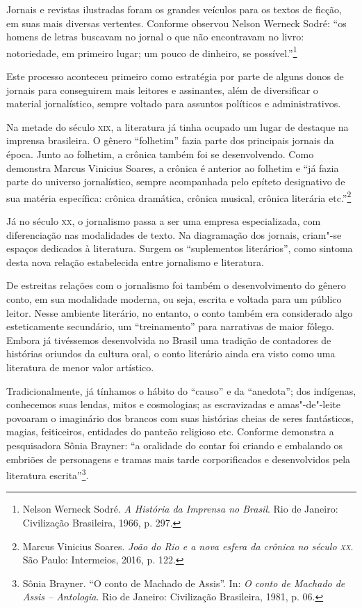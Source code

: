 \documentclass[11pt]{extarticle}
\begin{document}
Jornais e revistas ilustradas foram os grandes veículos para os textos
de ficção, em suas mais diversas vertentes. Conforme observou Nelson
Werneck Sodré: ``os homens de letras buscavam no jornal o que não
encontravam no livro: notoriedade, em primeiro lugar; um pouco de
dinheiro, se possível.''\footnote{Nelson Werneck Sodré. \emph{A História
  da Imprensa no Brasil}. Rio de Janeiro: Civilização Brasileira, 1966,
  p. 297.}

Este processo aconteceu primeiro como estratégia por parte de alguns
donos de jornais para conseguirem mais leitores e assinantes, além de
diversificar o material jornalístico, sempre voltado para assuntos
políticos e administrativos.

Na metade do século \textsc{xix}, a literatura já tinha ocupado um lugar de
destaque na imprensa brasileira. O gênero ``folhetim'' fazia parte dos
principais jornais da época. Junto ao folhetim, a crônica também foi se
desenvolvendo. Como demonstra Marcus Vinicius Soares, a crônica é
anterior ao folhetim e ``já fazia parte do universo jornalístico, sempre
acompanhada pelo epíteto designativo de sua matéria específica: crônica
dramática, crônica musical, crônica literária etc.''\footnote{Marcus
  Vinicius Soares. \emph{João do Rio e a nova esfera da crônica no
  século \textsc{xx}}. São Paulo: Intermeios, 2016, p. 122.}

Já no século \textsc{xx}, o jornalismo passa a ser uma empresa especializada, com
diferenciação nas modalidades de texto. Na diagramação dos jornais,
criam"-se espaços dedicados à literatura. Surgem os ``suplementos
literários'', como sintoma desta nova relação estabelecida entre
jornalismo e literatura.

De estreitas relações com o jornalismo foi também o desenvolvimento do
gênero conto, em sua modalidade moderna, ou seja, escrita e voltada para
um público leitor. Nesse ambiente literário, no entanto, o conto também
era considerado algo esteticamente secundário, um ``treinamento'' para
narrativas de maior fôlego. Embora já tivéssemos desenvolvida no Brasil
uma tradição de contadores de histórias oriundos da cultura oral, o
conto literário ainda era visto como uma literatura de menor valor
artístico.

Tradicionalmente, já tínhamos o hábito do ``causo'' e da ``anedota''; dos
indígenas, conhecemos suas lendas, mitos e cosmologias; as escravizadas e
amas"-de"-leite povoaram o imaginário dos brancos com suas histórias
cheias de seres fantásticos, magias, feiticeiros, entidades do panteão
religioso etc. Conforme demonstra a pesquisadora Sônia Brayner: ``a
oralidade do contar foi criando e embalando os embriões de personagens e
tramas mais tarde corporificados e desenvolvidos pela literatura
escrita''\footnote{Sônia Brayner. ``O conto de Machado de Assis''. In:
  \emph{O conto de Machado de Assis -- Antologia}. Rio de Janeiro:
  Civilização Brasileira, 1981, p. 06.}.
\end{document}
